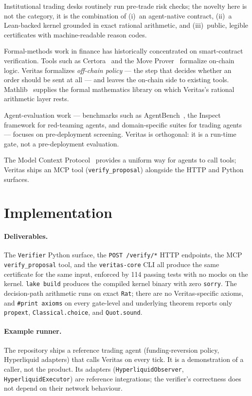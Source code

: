 \documentclass[11pt, a4paper]{article}
\begin{document}
Institutional trading desks routinely run pre-trade risk checks; the
novelty here is not the category, it is the combination of (i)~an
agent-native contract, (ii)~a Lean-backed kernel grounded in exact
rational arithmetic, and (iii)~public, legible certificates with
machine-readable reason codes.

Formal-methods work in finance has historically concentrated on
smart-contract verification. Tools such as Certora~\cite{certora} and
the Move Prover~\cite{moveprover} formalize on-chain logic. Veritas
formalizes \emph{off-chain policy} --- the step that decides whether an
order should be sent at all --- and leaves the on-chain side to existing
tools. Mathlib~\cite{mathlib} supplies the formal mathematics library
on which Veritas's rational arithmetic layer rests.

Agent-evaluation work --- benchmarks such as
AgentBench~\cite{agentbench}, the Inspect framework for red-teaming
agents, and domain-specific suites for trading agents --- focuses on
pre-deployment screening. Veritas is orthogonal: it is a run-time gate,
not a pre-deployment evaluation.

The Model Context Protocol~\cite{mcp} provides a uniform way for agents
to call tools; Veritas ships an MCP tool (\texttt{verify\_proposal})
alongside the HTTP and Python surfaces.

\section{Implementation}
\label{sec:impl}

\paragraph{Deliverables.} The \texttt{Verifier} Python surface, the
\texttt{POST /verify/*} HTTP endpoints, the MCP
\texttt{verify\_proposal} tool, and the \texttt{veritas-core} CLI all
produce the same certificate for the same input, enforced by 114
passing tests with no mocks on the kernel. \texttt{lake build}
produces the compiled kernel binary with zero \texttt{sorry}. The
decision-path arithmetic runs on exact \texttt{Rat}; there are no
Veritas-specific axioms, and \texttt{\#print axioms} on every
gate-level and underlying theorem reports only \texttt{propext},
\texttt{Classical.choice}, and \texttt{Quot.sound}.

\paragraph{Example runner.} The repository ships a reference
trading agent (funding-reversion policy, Hyperliquid adapters) that
calls Veritas on every tick. It is a demonstration of a caller, not
the product. Its adapters (\texttt{HyperliquidObserver},
\texttt{HyperliquidExecutor}) are reference integrations; the
verifier's correctness does not depend on their network behaviour.
\end{document}
